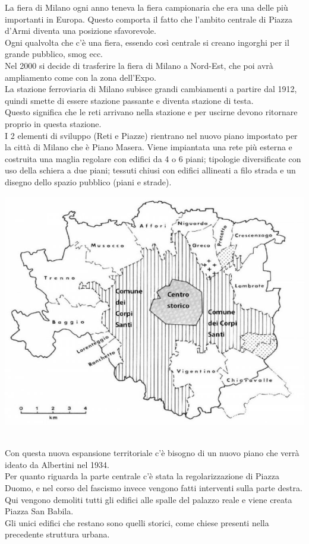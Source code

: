 \documentclass[a4paper,12pt, oneside]{book}
\begin{document}
  La fiera di Milano ogni anno teneva la fiera campionaria che era una delle più importanti in Europa. Questo comporta il fatto che l'ambito centrale di Piazza d'Armi diventa una posizione sfavorevole.\\
  Ogni qualvolta che c'è una fiera, essendo così centrale si creano ingorghi per il grande pubblico, smog ecc.\\
  Nel 2000 si decide di trasferire la fiera di Milano a Nord-Est, che poi avrà ampliamento come con la zona dell'Expo.\\
  La stazione ferroviaria di Milano subisce grandi cambiamenti a partire dal 1912, quindi smette di essere stazione passante e diventa stazione di testa.\\
  Questo significa che le reti arrivano nella stazione e per uscirne devono ritornare proprio in questa stazione.\\
  I 2 elementi di sviluppo (Reti e Piazze) rientrano nel nuovo piano impostato per la città di Milano che è Piano Masera. Viene impiantata una rete più esterna e costruita una maglia regolare con edifici da 4 o 6 piani; tipologie diversificate con uso della schiera a due piani; tessuti chiusi con edifici allineati a filo strada e un disegno dello spazio pubblico (piani e strade).\\
  \begin{center}
  	\includegraphics[width=0.6\linewidth]{"immagini/espansione milano 3"}
  	\label{fig:espansione milano 3}
  \end{center}
  \leavevmode\\
  Con questa nuova espansione territoriale c'è bisogno di un nuovo piano che verrà ideato da Albertini nel 1934.\\
  Per quanto riguarda la parte centrale c'è stata la regolarizzazione di Piazza Duomo, e nel corso del fascismo invece vengono fatti interventi sulla parte destra. Qui vengono demoliti tutti gli edifici alle spalle del palazzo reale e viene creata Piazza San Babila.\\
  Gli unici edifici che restano sono quelli storici, come chiese presenti nella precedente struttura urbana.\\
\end{document}
